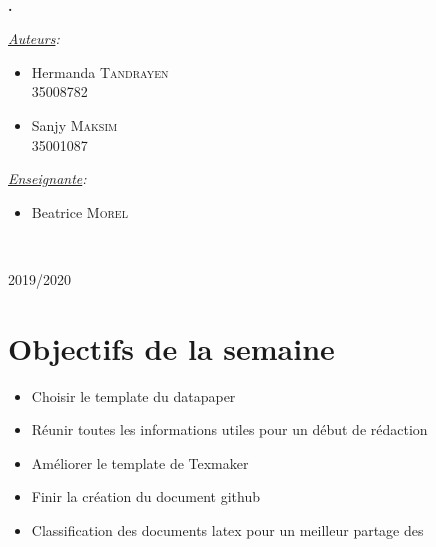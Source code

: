 \documentclass[11pt,oneside]{article}
\begin{document}
\begin{titlepage}
\phantom{aaaaaaaaaaaaaaaaaaaaaaaaaaaaaaaaaaaaaaa
ytrfdytfugvghikuhjbiujbhaaaaaaaaaaaaaaa}
\center
\fbox{\begin{minipage}[t][1cm][c]{8cm}
\begin{center}
{\huge \bfseries \textcolor{Rapport}{Feuille de Route}}
\end{center}
\end{minipage}}\\[0.5cm]
\textbf{\Large \color{Mulberry} .}\\[0.5cm] 
\begin{minipage}{0.5\textwidth}
\begin{flushleft} \large
\hspace{0.22\textwidth}\emph{\underline{Auteurs}:}\\
\begin{multicols}{2}
\begin{itemize}[font=\color{airforceblue} \Large, label=, leftmargin=0cm]
\item{Hermanda \textsc{Tandrayen} \\ {\small{35008782}}}
\item{Sanjy \textsc{Maksim} \\ {\small{35001087}}}
\end{itemize}
\end{multicols}
\end{flushleft}
\end{minipage}
\begin{minipage}{0.45\textwidth}
\begin{flushright} \large
\emph{\underline{Enseignante}:}\phantom{aaaaa}\\
\begin{itemize}[font=\color{amber} \Large, label=, leftmargin=3.5cm]
\item{Beatrice \textsc{Morel}}
\end{itemize}
\end{flushright}
\end{minipage}\\[0cm]
\vspace{10cm} 
\begin{center}
2019/2020
\end{center}
\vfill
\end{titlepage}



\renewcommand{\contentsname}{Sommaire}
\tableofcontents
\newpage
\part{Objectifs de la semaine}
\begin{itemize}
	\item Choisir le template du datapaper
	\item Réunir toutes les informations utiles pour un début de rédaction
	\item Améliorer le template de Texmaker
	\item Finir la création du document github 
	\item Classification des documents latex pour un meilleur partage des
\end{itemize}
\end{document}
